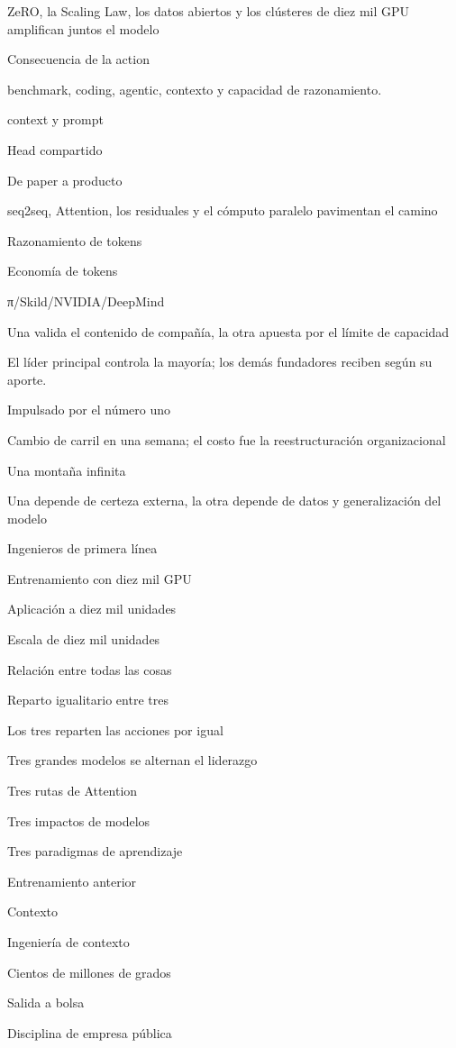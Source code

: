 \documentclass{article}
\begin{document}
ZeRO, la Scaling Law, los datos abiertos y los clústeres de diez mil GPU amplifican juntos el modelo

Consecuencia de la action

benchmark, coding, agentic, contexto y capacidad de razonamiento.

context y prompt

Head compartido

De paper a producto

seq2seq, Attention, los residuales y el cómputo paralelo pavimentan el camino

Razonamiento de tokens

Economía de tokens

π/Skild/NVIDIA/DeepMind

Una valida el contenido de compañía, la otra apuesta por el límite de capacidad

El líder principal controla la mayoría; los demás fundadores reciben según su aporte.

Impulsado por el número uno

Cambio de carril en una semana; el costo fue la reestructuración organizacional

Una montaña infinita

Una depende de certeza externa, la otra depende de datos y generalización del modelo

Ingenieros de primera línea

Entrenamiento con diez mil GPU

Aplicación a diez mil unidades

Escala de diez mil unidades

Relación entre todas las cosas

Reparto igualitario entre tres

Los tres reparten las acciones por igual

Tres grandes modelos se alternan el liderazgo

Tres rutas de Attention

Tres impactos de modelos

Tres paradigmas de aprendizaje

Entrenamiento anterior

Contexto

Ingeniería de contexto

Cientos de millones de grados

Salida a bolsa

Disciplina de empresa pública
\end{document}
